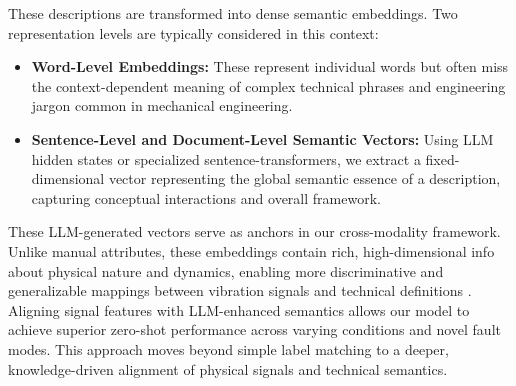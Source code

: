 These descriptions are transformed into dense semantic embeddings. Two representation levels are typically considered in this context:
\begin{itemize}
    \item \textbf{Word-Level Embeddings:} These represent individual words but often miss the context-dependent meaning of complex technical phrases and engineering jargon common in mechanical engineering.
    \item \textbf{Sentence-Level and Document-Level Semantic Vectors:} Using LLM hidden states or specialized sentence-transformers, we extract a fixed-dimensional vector representing the global semantic essence of a description, capturing conceptual interactions and overall framework.
\end{itemize}
These LLM-generated vectors serve as anchors in our cross-modality framework. Unlike manual attributes, these embeddings contain rich, high-dimensional info about physical nature and dynamics, enabling more discriminative and generalizable mappings between vibration signals and technical definitions \cite{brown2020language, devlin2018bert, industrial_llm_ref}. Aligning signal features with LLM-enhanced semantics allows our model to achieve superior zero-shot performance across varying conditions and novel fault modes. This approach moves beyond simple label matching to a deeper, knowledge-driven alignment of physical signals and technical semantics.
